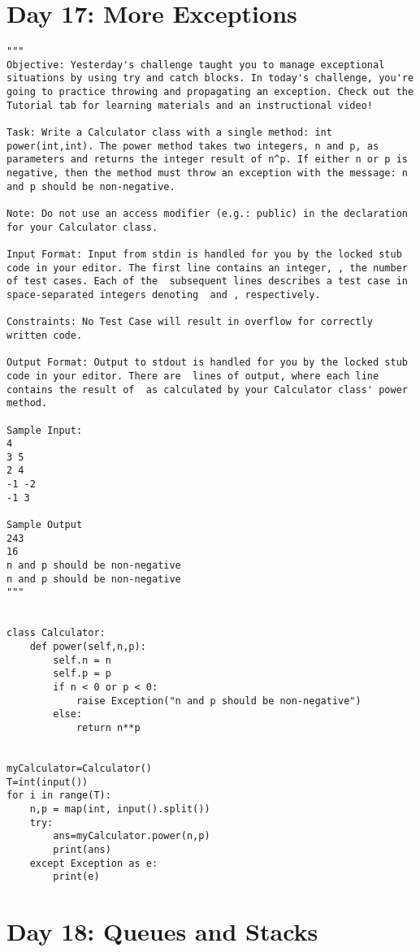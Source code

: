 \documentclass[11pt,a4paper]{article}
\begin{document}
\section{Day 17: More Exceptions}
\begin{lstlisting}
"""
Objective: Yesterday's challenge taught you to manage exceptional situations by using try and catch blocks. In today's challenge, you're going to practice throwing and propagating an exception. Check out the Tutorial tab for learning materials and an instructional video!

Task: Write a Calculator class with a single method: int power(int,int). The power method takes two integers, n and p, as parameters and returns the integer result of n^p. If either n or p is negative, then the method must throw an exception with the message: n and p should be non-negative.

Note: Do not use an access modifier (e.g.: public) in the declaration for your Calculator class.

Input Format: Input from stdin is handled for you by the locked stub code in your editor. The first line contains an integer, , the number of test cases. Each of the  subsequent lines describes a test case in  space-separated integers denoting  and , respectively.

Constraints: No Test Case will result in overflow for correctly written code.

Output Format: Output to stdout is handled for you by the locked stub code in your editor. There are  lines of output, where each line contains the result of  as calculated by your Calculator class' power method.

Sample Input:
4
3 5
2 4
-1 -2
-1 3

Sample Output
243
16
n and p should be non-negative
n and p should be non-negative
"""


class Calculator:
    def power(self,n,p):
        self.n = n
        self.p = p
        if n < 0 or p < 0:
            raise Exception("n and p should be non-negative")
        else:
            return n**p


myCalculator=Calculator()
T=int(input())
for i in range(T):
    n,p = map(int, input().split())
    try:
        ans=myCalculator.power(n,p)
        print(ans)
    except Exception as e:
        print(e) 
\end{lstlisting}


\newpage
\section{Day 18: Queues and Stacks}
\begin{lstlisting}
\end{lstlisting}
\end{document}
